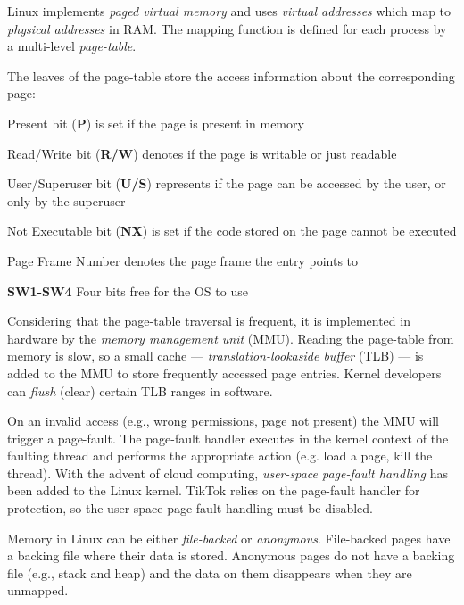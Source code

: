 \documentclass[conference]{IEEEtran}
\newcommand{\sysname}{TikTok}
\begin{document}
Linux implements \emph{paged virtual memory} and uses \emph{virtual addresses}
which map to \emph{physical addresses} in RAM. The mapping function is defined
for each process by a multi-level \emph{page-table}.

The leaves of the page-table store the access information about the
corresponding page:
\begin{LaTeXdescription}
    \item[Present bit (\textbf{P})] is set if the page is present in memory
    \item[Read/Write bit (\textbf{R/W})] denotes if the page is writable or just
         readable
    \item[User/Superuser bit (\textbf{U/S})] represents if the page can be 
    accessed by the user, or only by the superuser
    \item[Not Executable bit (\textbf{NX})] is set if the code stored on the 
    page cannot be executed
    \item[Page Frame Number] denotes the page frame the entry points to
    \item[\textbf{SW1-SW4}] Four bits free for the OS to use
\end{LaTeXdescription}

Considering that the page-table traversal is frequent, it is implemented in
hardware by the \emph{memory management unit} (MMU). Reading the page-table from
memory is slow, so a small cache --- \emph{translation-lookaside buffer} (TLB)
--- is added to the MMU to store frequently accessed page entries. Kernel
developers can \emph{flush} (clear) certain TLB ranges in software.

On an invalid access (e.g., wrong permissions, page not present) the MMU will
trigger a page-fault. The page-fault handler executes in the kernel context of
the faulting thread and performs the appropriate action (e.g. load a page, kill
the thread). With the advent of cloud computing, \emph{user-space page-fault
handling} has been added to the Linux kernel. \sysname{} relies on the page-fault
handler for protection, so the user-space page-fault handling must be disabled.

Memory in Linux can be either \emph{file-backed} or \emph{anonymous}.
File-backed pages have a backing file where their data is stored. Anonymous
pages do not have a backing file (e.g., stack and heap) and the data on them
disappears when they are unmapped.
\end{document}
